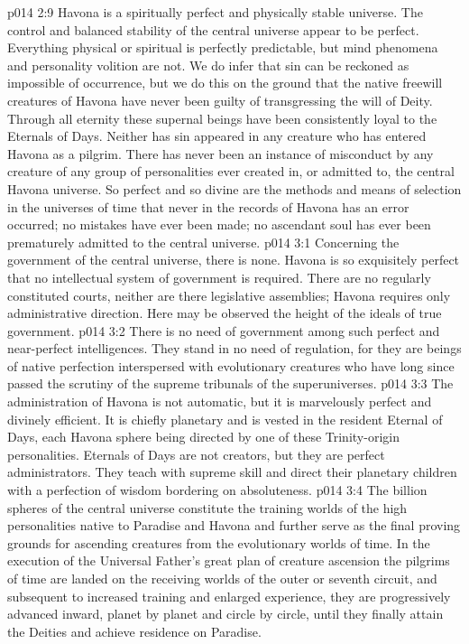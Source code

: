 \pc \vs p014 2:9 Havona is a spiritually perfect and physically stable universe. The control and balanced stability of the central universe appear to be perfect. Everything physical or spiritual is perfectly predictable, but mind phenomena and personality volition are not. We do infer that sin can be reckoned as impossible of occurrence, but we do this on the ground that the native freewill creatures of Havona have never been guilty of transgressing the will of Deity. Through all eternity these supernal beings have been consistently loyal to the Eternals of Days. Neither has sin appeared in any creature who has entered Havona as a pilgrim. There has never been an instance of misconduct by any creature of any group of personalities ever created in, or admitted to, the central Havona universe. So perfect and so divine are the methods and means of selection in the universes of time that never in the records of Havona has an error occurred; no mistakes have ever been made; no ascendant soul has ever been prematurely admitted to the central universe.
\vs p014 3:1 Concerning the government of the central universe, there is none. Havona is so exquisitely perfect that no intellectual system of government is required. There are no regularly constituted courts, neither are there legislative assemblies; Havona requires only administrative direction. Here may be observed the height of the ideals of true government.
\vs p014 3:2 There is no need of government among such perfect and near\hyp{}perfect intelligences. They stand in no need of regulation, for they are beings of native perfection interspersed with evolutionary creatures who have long since passed the scrutiny of the supreme tribunals of the superuniverses.
\vs p014 3:3 The administration of Havona is not automatic, but it is marvelously perfect and divinely efficient. It is chiefly planetary and is vested in the resident Eternal of Days, each Havona sphere being directed by one of these Trinity\hyp{}origin personalities. Eternals of Days are not creators, but they are perfect administrators. They teach with supreme skill and direct their planetary children with a perfection of wisdom bordering on absoluteness.
\vs p014 3:4 The billion spheres of the central universe constitute the training worlds of the high personalities native to Paradise and Havona and further serve as the final proving grounds for ascending creatures from the evolutionary worlds of time. In the execution of the Universal Father’s great plan of creature ascension the pilgrims of time are landed on the receiving worlds of the outer or seventh circuit, and subsequent to increased training and enlarged experience, they are progressively advanced inward, planet by planet and circle by circle, until they finally attain the Deities and achieve residence on Paradise.
